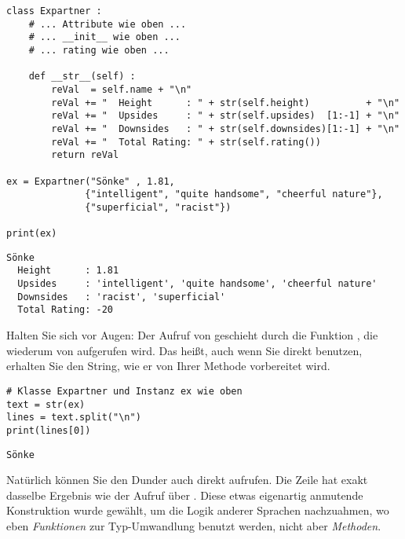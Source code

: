 \begin{codebox}
\begin{verbatim}
class Expartner :
    # ... Attribute wie oben ...
    # ... __init__ wie oben ...
    # ... rating wie oben ...
    
    def __str__(self) :
        reVal  = self.name + "\n"
        reVal += "  Height      : " + str(self.height)          + "\n"
        reVal += "  Upsides     : " + str(self.upsides)  [1:-1] + "\n"
        reVal += "  Downsides   : " + str(self.downsides)[1:-1] + "\n"
        reVal += "  Total Rating: " + str(self.rating())
        return reVal

ex = Expartner("Sönke" , 1.81, 
              {"intelligent", "quite handsome", "cheerful nature"},
              {"superficial", "racist"})

print(ex)
\end{verbatim}
\end{codebox}
\begin{cmdbox}
\begin{verbatim}
Sönke
  Height      : 1.81
  Upsides     : 'intelligent', 'quite handsome', 'cheerful nature'
  Downsides   : 'racist', 'superficial'
  Total Rating: -20
\end{verbatim}
\end{cmdbox}

Halten Sie sich vor Augen: Der Aufruf von  geschieht durch die Funktion , die wiederum von  aufgerufen wird. Das heißt, auch wenn Sie direkt  benutzen, erhalten Sie den String, wie er von Ihrer Methode vorbereitet wird.

\begin{codebox}
\begin{verbatim}
# Klasse Expartner und Instanz ex wie oben
text = str(ex)
lines = text.split("\n")
print(lines[0])
\end{verbatim}
\end{codebox}
\begin{cmdbox}
\begin{verbatim}
Sönke
\end{verbatim}
\end{cmdbox}

Natürlich können Sie den Dunder auch direkt aufrufen. Die Zeile  hat exakt dasselbe Ergebnis wie der Aufruf über . Diese etwas eigenartig anmutende Konstruktion wurde gewählt, um die Logik anderer Sprachen nachzuahmen, wo eben \emph{Funktionen} zur Typ-Umwandlung benutzt werden, nicht aber \emph{Methoden}.

